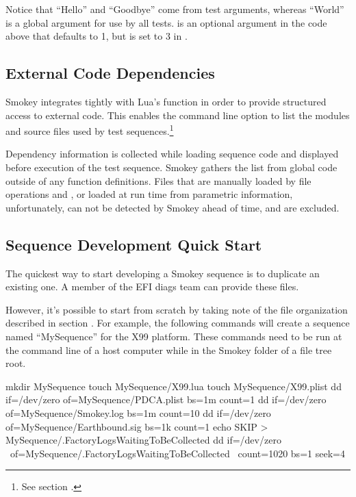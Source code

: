 Notice that ``Hello'' and ``Goodbye'' come from test arguments, whereas
``World'' is a global argument for use by all tests.   is an
optional argument in the code above that defaults to 1, but is set to 3 in
.

\subsection{External Code Dependencies}
\label{sec:ExternalCodeDependencies}

Smokey integrates tightly with Lua's  function in order to
provide structured access to external code.  This enables the
 command line option to list the modules and source
files used by test sequences.\footnote{See section .}

Dependency information is collected while loading sequence code and displayed
before execution of the test sequence.  Smokey gathers the list from global
code outside of any function definitions.  Files that are manually loaded by
file operations and , or loaded at run time from parametric
information, unfortunately, can not be detected by Smokey ahead of time, and
are excluded.

\subsection{Sequence Development Quick Start}

The quickest way to start developing a Smokey sequence is to duplicate an
existing one.  A member of the EFI diags team can provide these files.

However, it's possible to start from scratch by taking note of the file
organization described in section .  For
example, the following commands will create a sequence named
``MySequence'' for the X99 platform.  These commands need to be run at
the command line of a host computer while in the Smokey folder of a
file tree root.

\begin{CommandLine}
mkdir MySequence
touch MySequence/X99.lua
touch MySequence/X99.plist
dd if=/dev/zero of=MySequence/PDCA.plist bs=1m count=1
dd if=/dev/zero of=MySequence/Smokey.log bs=1m count=10
dd if=/dev/zero of=MySequence/Earthbound.sig bs=1k count=1
echo SKIP > MySequence/.FactoryLogsWaitingToBeCollected
dd if=/dev/zero \
	of=MySequence/.FactoryLogsWaitingToBeCollected \
	count=1020 bs=1 seek=4
\end{CommandLine}

